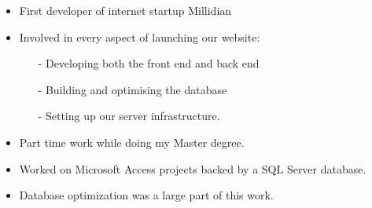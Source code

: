 \documentclass[10pt,a4paper]{../altacv}
\begin{document}




\medskip\medskip{}

\begin{itemize}
\item\small{First developer of internet startup Millidian}
\item\small{Involved in every aspect of launching our website:}
\begin{itemize}
\item[-]\small{Developing both the front end and back end}
\item[-]\small{Building and optimising the database}
\item[-]\small{Setting up our server infrastructure.}
\end{itemize}
\end{itemize}




\medskip\medskip{}

\begin{itemize}
	\item\small{Part time work while doing my Master degree.}
	\item\small{Worked on Microsoft Access projects backed by a SQL Server database.}
	\item\small{Database optimization was a large part of this work.}
\end{itemize}










\newpage
\end{document}

